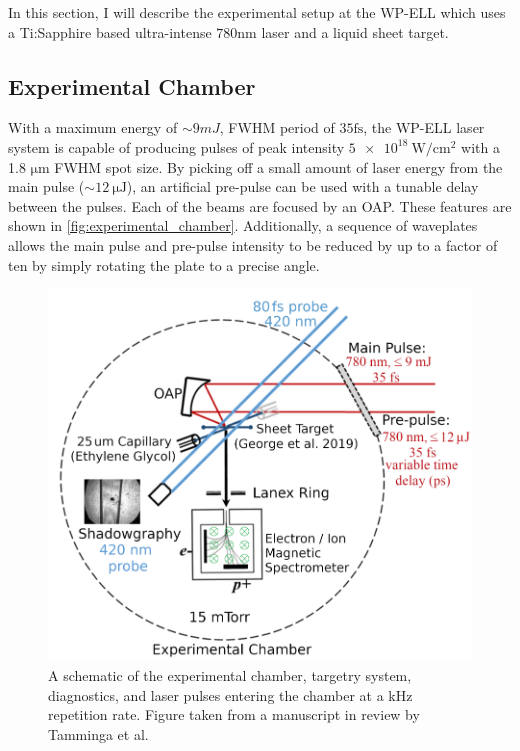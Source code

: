 In this section, I will describe the experimental setup at the \gls{WP-ELL} which uses a Ti:Sapphire based ultra-intense $780 \unit{\nano \meter}$ laser and a liquid sheet target.  

\subsection{Experimental Chamber}

With a maximum energy of $\sim 9 \unit{mJ}$, \gls{FWHM} period of $35 \unit{\femto \second}$, the \gls{WP-ELL} laser system is capable of producing pulses of peak intensity $\SI{5e18}{\watt \per \centi \meter \squared}$ with a 1.8 $\unit{\micro \meter}$ \gls{FWHM} spot size. By picking off a small amount of laser energy from the main pulse ($\sim \SI{12}{\micro \joule}$), an artificial pre-pulse can be used with a tunable delay between the pulses. Each of the beams are focused by an \gls{OAP}. These features are shown in \autoref{fig:experimental_chamber}. Additionally, a sequence of waveplates allows the main pulse and pre-pulse intensity to be reduced by up to a factor of ten by simply rotating the plate to a precise angle.

\begin{figure}
	\centering 
	\includegraphics[width=0.75\linewidth]{planning/images/daq/experimental_chamber.PNG}
	\caption{A schematic of the experimental chamber, targetry system, diagnostics, and laser pulses entering the chamber at a kHz repetition rate. Figure taken from a manuscript in review by Tamminga et al.}
	\label{fig:experimental_chamber}
\end{figure}

